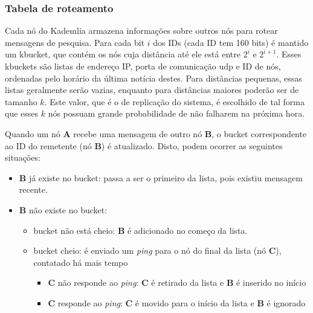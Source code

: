 \subsubsection*{Tabela de roteamento}

Cada nó do Kademlia armazena informações sobre outros nós para rotear mensagens de
pesquisa. Para cada bit $i$ dos IDs (cada ID tem 160 bits) é mantido um \gls{kbucket},
que contém os nós cuja distância até ele está entre $2^i$ e $2^{i+1}$. Esses
\glspl*{kbucket} são listas de endereço IP, porta de comunicação \gls*{udp} e ID de
nós, ordenadas pelo horário da última notícia destes. Para distâncias pequenas, essas
listas geralmente serão vazias, enquanto para distâncias maiores poderão ser de tamanho
$k$. Este valor, que é o de replicação do sistema, é escolhido de tal forma que esses
$k$ nós possuam grande probabilidade de não falharem na próxima hora.

Quando um nó \textbf{A} recebe uma mensagem de outro nó \textbf{B}, o \gls*{bucket}
correspondente ao ID do remetente (nó \textbf{B}) é atualizado. Disto, podem ocorrer as
seguintes situações:

\begin{itemize}
    \item \textbf{B} já existe no \gls*{bucket}: passa a ser o primeiro da lista, pois
        existiu mensagem recente.

    \item \textbf{B} não existe no \gls*{bucket}:
        \begin{itemize}
            \item \gls*{bucket} não está cheio: \textbf{B} é adicionado no começo da
                lista.
            \item \gls*{bucket} cheio: é enviado um \emph{ping} para o nó do final da
                lista (nó \textbf{C}), contatado há mais tempo

            \begin{itemize}
                \item \textbf{C} não responde ao \emph{ping}: \textbf{C} é retirado da
                lista e \textbf{B} é inserido no início
                \item \textbf{C} responde ao \emph{ping}: \textbf{C} é movido para o
                início da lista e \textbf{B} é ignorado
            \end{itemize}
        \end{itemize}

\end{itemize}

